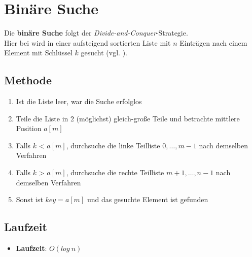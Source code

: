 \section{Binäre Suche}

Die \textbf{binäre Suche} folgt der \textit{Divide-and-Conquer}-Strategie.\\
Hier bei wird in einer aufsteigend sortierten Liste mit $n$ Einträgen nach einem Element mit Schlüssel $k$ gesucht (vgl. \cite[174 f.]{OW17c}).\\

\subsection{Methode}
\begin{enumerate}
    \item Ist die Liste leer, war die Suche erfolglos
    \item Teile die Liste in 2 (möglichst) gleich-große Teile und betrachte mittlere Position $a[m]$
    \item Falls $k$ < $a[m]$, durchsuche die linke Teilliste $0,\ldots, m-1$ nach demselben Verfahren
    \item Falls $k$ > $a[m]$, durchsuche die rechte Teilliste $m+1,\ldots, n-1$ nach demselben Verfahren
    \item Sonst ist $key = a[m]$ und das gesuchte Element ist gefunden
\end{enumerate}



\subsection{Laufzeit}
\begin{itemize}
    \item \textbf{Laufzeit}: $O(log\ n)$
\end{itemize}